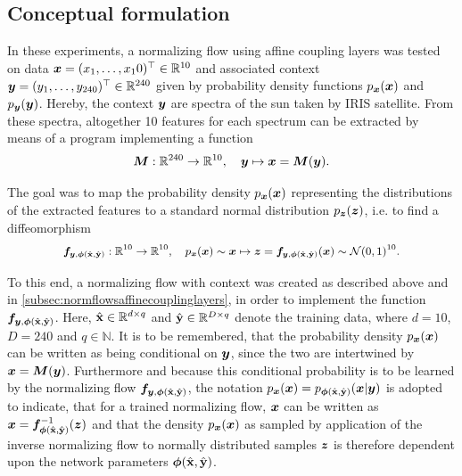 \documentclass[a4paper,12pt]{report}
\begin{document}
\subsection{Conceptual formulation}
In these experiments, a normalizing flow using affine coupling layers was tested on data $\bm{x}=(x_1,\dots,x_10)^\top \in \mathbb{R}^{10}$ and associated context $\bm{y}=(y_1,\dots,y_{240})^\top \in \mathbb{R}^{240}$ given by probability density functions $p_{\bm{x}}(\bm{x})$ and $p_{\bm{y}}(\bm{y})$. Hereby, the context $\bm{y}$ are spectra of the sun taken by IRIS satellite. From these spectra, altogether 10 features for each spectrum can be extracted by means of a program implementing a function
\begin{equation}\label{eq:featureextraction}
\bm{M}:\mathbb{R}^{240} \rightarrow \mathbb{R}^{10}, \quad \bm{y}\mapsto \bm{x} = \bm{M}(\bm{y}).
\end{equation}

The goal was to map the probability density $p_{\bm{x}}(\bm{x})$ representing the distributions of the extracted features to a standard normal distribution $p_{\bm{z}}(\bm{z})$, i.e. to find a diffeomorphism
\begin{align}\small\begin{aligned}
\bm{f}_{\bm{y},\bm{\phi}(\hat{\boldsymbol{\mathbf{x}}},\hat{\boldsymbol{\mathbf{y}}})}: \mathbb{R}^{10} \rightarrow \mathbb{R}^{10}, \quad p_{\bm{x}}(\bm{x}) \sim \bm{x} \mapsto \bm{z} = \bm{f}_{\bm{y},\bm{\phi}(\hat{\boldsymbol{\mathbf{x}}},\hat{\boldsymbol{\mathbf{y}}})}(\bm{x}) \sim  \mathcal{N}(0,1)^{10}.
\end{aligned}\end{align}

To this end, a normalizing flow with context was created as described above and in \cref{subsec:normflowsaffinecouplinglayers}, in order to implement the function $\bm{f}_{\bm{y},\bm{\phi}(\hat{\boldsymbol{\mathbf{x}}},\hat{\boldsymbol{\mathbf{y}}})}$. Here, $\hat{\boldsymbol{\mathbf{x}}} \in \mathbb{R}^{d\times q}$ and $\hat{\boldsymbol{\mathbf{y}}} \in \mathbb{R}^{D\times q}$ denote the training data, where $d=10$, $D = 240$ and $q \in \mathbb{N}$. It is to be remembered, that the probability density $p_{\bm{x}}(\bm{x})$ can be written as being conditional on $\bm{y}$, since the two are intertwined by $\bm{x} = \bm{M}(\bm{y})$. Furthermore and because this conditional probability is to be learned by the normalizing flow $\bm{f}_{\bm{y},\bm{\phi}(\hat{\boldsymbol{\mathbf{x}}},\hat{\boldsymbol{\mathbf{y}}})}$, the notation $p_{\bm{x}}(\bm{x}) = p_{\bm{\phi}(\hat{\boldsymbol{\mathbf{x}}},\hat{\boldsymbol{\mathbf{y}}})}(\bm{x}|\bm{y})$ is adopted to indicate, that for a trained normalizing flow, $\bm{x}$ can be written as $\bm{x} = \bm{f}^{-1}_{\bm{\phi}(\hat{\boldsymbol{\mathbf{x}}},\hat{\boldsymbol{\mathbf{y}}})}(\bm{z})$ and that the density $p_{\bm{x}}(\bm{x})$ as sampled by application of the inverse normalizing flow to normally distributed samples $\bm{z}$ is therefore dependent upon the network parameters $\bm{\phi}(\hat{\boldsymbol{\mathbf{x}}},\hat{\boldsymbol{\mathbf{y}}})$.
\end{document}
